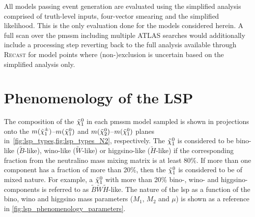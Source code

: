 All models passing event generation are evaluated using the simplified analysis comprised of truth-level inputs, four-vector smearing and the simplified likelihood. This is the only evaluation done for the models considered herein. A full scan over the \gls{pmssm} including multiple ATLAS searches would additionally include a processing step reverting back to the full analysis available through \textsc{Recast} for model points where (non-)exclusion is uncertain based on the simplified analysis only.

\section{Phenomenology of the LSP}\label{sec:lsp_pheno}

The composition of the $\tilde{\chi}_1^0$ in each \gls{pmssm} model sampled is shown in projections onto the \mbox{$m(\tilde{\chi}_1^\pm)$--$m(\tilde{\chi}_1^0)$} and \mbox{$m(\tilde{\chi}_2^0)$--$m(\tilde{\chi}_1^0)$} planes in~\cref{fig:lsp_types,fig:lsp_types_N2}, respectively. The $\tilde{\chi}_1^0$ is considered to be bino-like ($\tilde{B}$-like), wino-like ($\tilde{W}$-like) or higgsino-like ($\tilde{H}$-like) if the corresponding fraction from the neutralino mass mixing matrix is at least 80\%. If more than one component has a fraction of more than 20\%, then the $\tilde{\chi}_1^0$ is considered to be of mixed nature. For example, a $\tilde{\chi}_1^0$ with more than 20\% bino-, wino- and higgsino-components is referred to as $\tilde{B}\tilde{W}\tilde{H}$-like. The nature of the \gls{lsp} as a function of the bino, wino and higgsino mass parameters ($M_1$, $M_2$ and $\mu$) is shown as a reference in \cref{fig:lsp_phenomenology_parameters}. 

